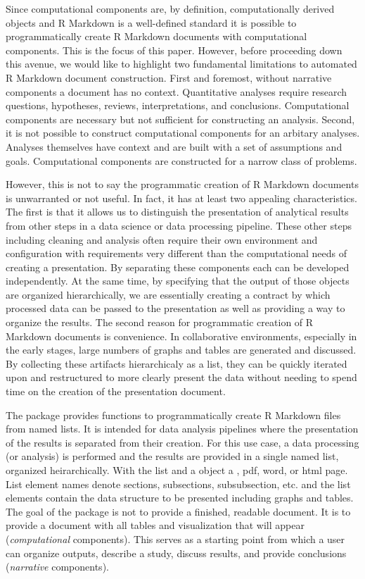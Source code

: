 Since computational components are, by definition, computationally
derived objects and R Markdown is a well-defined standard it is possible
to programmatically create R Markdown documents with computational
components. This is the focus of this paper. However, before proceeding
down this avenue, we would like to highlight two fundamental limitations
to automated R Markdown document construction. First and foremost,
without narrative components a document has no context. Quantitative
analyses require research questions, hypotheses, reviews,
interpretations, and conclusions. Computational components are necessary
but not sufficient for constructing an analysis. Second, it is not
possible to construct computational components for an arbitary analyses.
Analyses themselves have context and are built with a set of assumptions
and goals. Computational components are constructed for a narrow class
of problems.

However, this is not to say the programmatic creation of R Markdown
documents is unwarranted or not useful. In fact, it has at least two
appealing characteristics. The first is that it allows us to distinguish
the presentation of analytical results from other steps in a data
science or data processing pipeline. These other steps including
cleaning and analysis often require their own environment and
configuration with requirements very different than the computational
needs of creating a presentation. By separating these components each
can be developed independently. At the same time, by specifying that the
output of those objects are organized hierarchically, we are essentially
creating a contract by which processed data can be passed to the
presentation as well as providing a way to organize the results. The
second reason for programmatic creation of R Markdown documents is
convenience. In collaborative environments, especially in the early
stages, large numbers of graphs and tables are generated and discussed.
By collecting these artifacts hierarchicaly as a list, they can be
quickly iterated upon and restructured to more clearly present the data
without needing to spend time on the creation of the presentation
document.

The  package provides functions to programmatically create
R Markdown files from named lists. It is intended for data analysis
pipelines where the presentation of the results is separated from their
creation. For this use case, a data processing (or analysis) is
performed and the results are provided in a single named list, organized
heirarchically. With the list and a  object a
 \citep{blischak2019}, pdf, word, or html page. List
element names denote sections, subsections, subsubsection, etc. and the
list elements contain the data structure to be presented including
graphs and tables. The goal of the package is not to provide a finished,
readable document. It is to provide a document with all tables and
visualization that will appear (\emph{computational} components). This
serves as a starting point from which a user can organize outputs,
describe a study, discuss results, and provide conclusions
(\emph{narrative} components).

